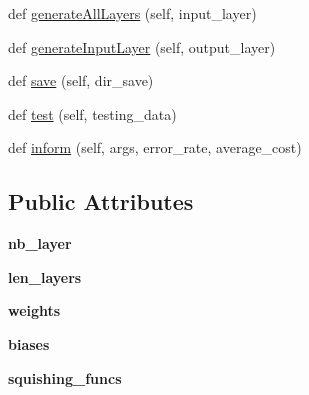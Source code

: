\begin{DoxyCompactItemize}
def \hyperlink{classsrc_1_1neuralNetwork_1_1NeuralNetwork_adde0d575e9f40dd7740fcb712b293002}{generate\+All\+Layers} (self, input\+\_\+layer)
\item 
def \hyperlink{classsrc_1_1neuralNetwork_1_1NeuralNetwork_ab287315a1443d6cbf3c6b405a5035be8}{generate\+Input\+Layer} (self, output\+\_\+layer)
\item 
def \hyperlink{classsrc_1_1neuralNetwork_1_1NeuralNetwork_a30341b6e19d739fb71b1d0370b72b903}{save} (self, dir\+\_\+save)
\item 
def \hyperlink{classsrc_1_1neuralNetwork_1_1NeuralNetwork_a8043e1545c08fb9a9215d83ba021bd32}{test} (self, testing\+\_\+data)
\item 
def \hyperlink{classsrc_1_1neuralNetwork_1_1NeuralNetwork_a819389f2ec6231ffdccf186e3f32eb9d}{inform} (self, args, error\+\_\+rate, average\+\_\+cost)
\end{DoxyCompactItemize}
\subsection*{Public Attributes}
\begin{DoxyCompactItemize}
\item 
{\bfseries nb\+\_\+layer}\hypertarget{classsrc_1_1neuralNetwork_1_1NeuralNetwork_a0f8b52022c64b3ee2cea1d1606b65da4}{}\label{classsrc_1_1neuralNetwork_1_1NeuralNetwork_a0f8b52022c64b3ee2cea1d1606b65da4}

\item 
{\bfseries len\+\_\+layers}\hypertarget{classsrc_1_1neuralNetwork_1_1NeuralNetwork_a8346128fedcd7a85f7b829ab91ae3a36}{}\label{classsrc_1_1neuralNetwork_1_1NeuralNetwork_a8346128fedcd7a85f7b829ab91ae3a36}

\item 
{\bfseries weights}\hypertarget{classsrc_1_1neuralNetwork_1_1NeuralNetwork_aeb0760fbe24ae24b183921b6104de2c7}{}\label{classsrc_1_1neuralNetwork_1_1NeuralNetwork_aeb0760fbe24ae24b183921b6104de2c7}

\item 
{\bfseries biases}\hypertarget{classsrc_1_1neuralNetwork_1_1NeuralNetwork_a6d2938841ec5e36a2246c80ad0d63385}{}\label{classsrc_1_1neuralNetwork_1_1NeuralNetwork_a6d2938841ec5e36a2246c80ad0d63385}

\item 
{\bfseries squishing\+\_\+funcs}\hypertarget{classsrc_1_1neuralNetwork_1_1NeuralNetwork_aeefddd4ccdf67a01d745475e3b59c23f}{}\label{classsrc_1_1neuralNetwork_1_1NeuralNetwork_aeefddd4ccdf67a01d745475e3b59c23f}

\end{DoxyCompactItemize}


